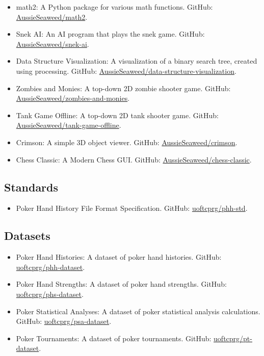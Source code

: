 \documentclass{article}
\begin{document}
{\begin{itemize}[noitemsep]
			\item math2: A Python package for various math functions. GitHub: \href{https://github.com/AussieSeaweed/math2}{AussieSeaweed/math2}.
			\item Snek AI: An AI program that plays the snek game. GitHub: \href{https://github.com/AussieSeaweed/snek-ai}{AussieSeaweed/snek-ai}.
			\item Data Structure Visualization: A visualization of a binary search tree, created using processing. GitHub: \href{https://github.com/AussieSeaweed/data-structure-visualization}{AussieSeaweed/data-structure-visualization}.
			\item Zombies and Monies: A top-down 2D zombie shooter game. GitHub: \href{https://github.com/AussieSeaweed/zombies-and-monies}{AussieSeaweed/zombies-and-monies}.
			\item Tank Game Offline: A top-down 2D tank shooter game. GitHub: \href{https://github.com/AussieSeaweed/tank-game-offline}{AussieSeaweed/tank-game-offline}.
			\item Crimson: A simple 3D object viewer. GitHub: \href{https://github.com/AussieSeaweed/crimson}{AussieSeaweed/crimson}.
			\item Chess Classic: A Modern Chess GUI. GitHub: \href{https://github.com/AussieSeaweed/chess-classic}{AussieSeaweed/chess-classic}.
		\end{itemize}

		\subsection*{Standards}

		\begin{itemize}[noitemsep]
			\item Poker Hand History File Format Specification. GitHub: \href{https://github.com/uoftcprg/phh-std}{uoftcprg/phh-std}.
		\end{itemize}

		\subsection*{Datasets}

		\begin{itemize}[noitemsep]
			\item Poker Hand Histories: A dataset of poker hand histories. GitHub: \href{https://github.com/uoftcprg/phh-dataset}{uoftcprg/phh-dataset}.
		\item Poker Hand Strengths: A dataset of poker hand strengths. GitHub: \href{https://github.com/uoftcprg/phs-dataset}{uoftcprg/phs-dataset}.
			\item Poker Statistical Analyses: A dataset of poker statistical analysis calculations. GitHub: \href{https://github.com/uoftcprg/psa-dataset}{uoftcprg/psa-dataset}.
			\item Poker Tournaments: A dataset of poker tournaments. GitHub: \href{https://github.com/uoftcprg/pt-dataset}{uoftcprg/pt-dataset}.
		\end{itemize}

}
\end{document}
